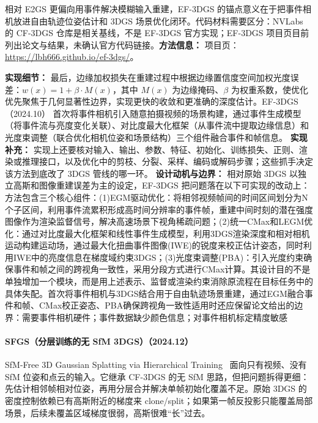 相对 E2GS 更偏向用事件解决模糊输入重建，EF-3DGS 的锚点意义在于把事件相机放进自由轨迹位姿估计和 3DGS 场景优化闭环。代码材料需要区分：NVLabs 的 CF-3DGS 仓库是相关基线，不是 EF-3DGS 官方实现；EF-3DGS 项目页目前列出论文与结果，未确认官方代码链接。\textbf{方法信息：} 项目页：\url{https://lbh666.github.io/ef-3dgs/}。

\textbf{实现细节：} 最后，边缘加权损失在重建过程中根据边缘置信度空间加权光度误差：$w(x) = 1 + \beta \cdot M(x)$，其中 $M(x)$ 为边缘掩码、$\beta$ 为权重系数，使优化优先聚焦于几何显著性边界，实现更快的收敛和更准确的深度估计。EF-3DGS（2024.10） 首次将事件相机引入随意拍摄视频的场景构建，通过事件生成模型（将事件流与亮度变化关联）、对比度最大化框架（从事件流中提取边缘信息）和光度束调整（联合优化相机位姿和场景结构）三个组件融合事件和帧信息。
\textbf{实现补充：} 实现上还要核对输入、输出、参数、特征、初始化、训练损失、正则、渲染或推理接口，以及优化中的剪枝、分裂、采样、编码或解码步骤；这些抓手决定该方法到底改了 3DGS 管线的哪一环。
\textbf{设计动机与边界：} 相对原始 3DGS 以独立高斯和图像重建误差为主的设定，EF-3DGS 把问题落在以下可实现的改动上：方法包含三个核心组件：(1)EGM驱动优化：将相邻视频帧间的时间区间划分为N个子区间，利用事件流累积形成高时间分辨率的事件帧，重建中间时刻的潜在强度图像作为渲染监督信号，解决高速场景下视角稀疏问题；(2)统一CMax和LEGM优化：通过对比度最大化框架和线性事件生成模型，利用3DGS渲染深度和相对相机运动构建运动场，通过最大化扭曲事件图像(IWE)的锐度来校正估计姿态，同时利用IWE中的亮度信息在梯度域约束3DGS；(3)光度束调整(PBA)：引入光度约束确保事件和帧之间的跨视角一致性，采用分段方式进行CMax计算。其设计目的不是单独增加一个模块，而是用上述表示、监督或渲染约束消除原流程在目标任务中的具体失配。首次将事件相机与3DGS结合用于自由轨迹场景重建，通过EGM融合事件和帧、CMax校正姿态、PBA确保跨视角一致性适用时还应保留论文给出的边界：需要事件相机硬件；事件数据缺少颜色信息；对事件相机标定精度敏感
\paragraph{SFGS（分层训练的无 SfM 3DGS）（2024.12）}
SfM-Free 3D Gaussian Splatting via Hierarchical Training~\cite{2412_01553} 面向只有视频、没有 SfM 位姿和点云的输入。它继承 CF-3DGS 的无 SfM 思路，但把问题拆得更细：先估计相邻帧相对位姿，再用分层合并解决单帧初始化覆盖不足。原始 3DGS 的密度控制依赖已有高斯附近的梯度来 clone/split；如果第一帧反投影只能覆盖局部场景，后续未覆盖区域梯度很弱，高斯很难“长”过去。

